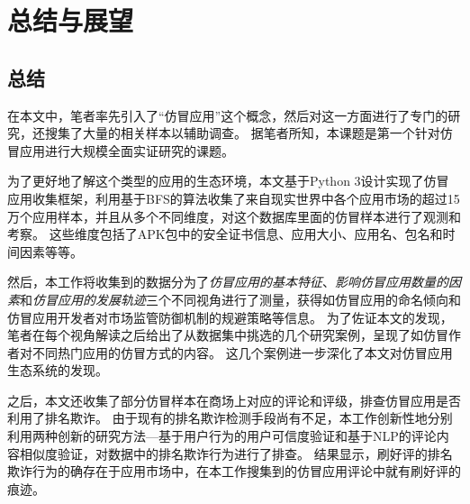 \chapter{总结与展望}
\label{chp:future}

\section{总结}
在本文中，笔者率先引入了``仿冒应用''这个概念，然后对这一方面进行了专门的研究，还搜集了大量的相关样本以辅助调查。
据笔者所知，本课题是第一个针对仿冒应用进行大规模全面实证研究的课题。

为了更好地了解这个类型的应用的生态环境，本文基于Python 3设计实现了仿冒应用收集框架\mytool，利用基于BFS的算法收集了来自现实世界中各个应用市场的超过15万个应用样本，并且从多个不同维度，对这个数据库里面的仿冒样本进行了观测和考察。
这些维度包括了APK包中的安全证书信息、应用大小、应用名、包名和时间因素等等。

然后，本工作将收集到的数据分为了\emph{仿冒应用的基本特征}、\emph{影响仿冒应用数量的因素}和\emph{仿冒应用的发展轨迹}三个不同视角进行了测量，获得如仿冒应用的命名倾向和仿冒应用开发者对市场监管防御机制的规避策略等信息。
为了佐证本文的发现，笔者在每个视角解读之后给出了从数据集中挑选的几个研究案例，呈现了如仿冒作者对不同热门应用的仿冒方式的内容。
这几个案例进一步深化了本文对仿冒应用生态系统的发现。

之后，本文还收集了部分仿冒样本在商场上对应的评论和评级，排查仿冒应用是否利用了排名欺诈。
由于现有的排名欺诈检测手段尚有不足，本工作创新性地分别利用两种创新的研究方法---基于用户行为的用户可信度验证和基于NLP的评论内容相似度验证，对数据中的排名欺诈行为进行了排查。
结果显示，刷好评的排名欺诈行为的确存在于应用市场中，在本工作搜集到的仿冒应用评论中就有刷好评的痕迹。

